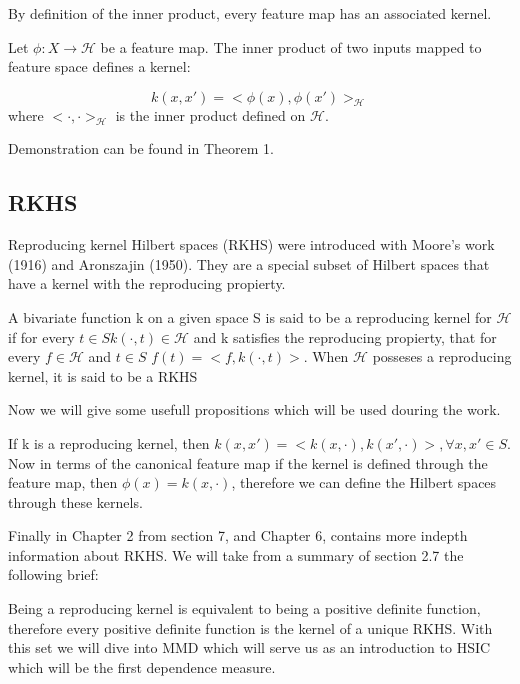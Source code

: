 By definition of the inner product, every feature map has an associated kernel.

\begin{defn}
Let $\phi:X\rightarrow\mathcal{H}$ be a feature map. The inner product of two inputs mapped to feature space defines a kernel:

$$
k(x,x') = <\phi(x),\phi(x')>_{\mathcal{H}}
$$
where $<\cdot,\cdot>_{\mathcal{H}}$ is the inner product defined on $\mathcal{H}$.
\end{defn}
Demonstration can be found in \cite{Feature_maps} Theorem 1.

\subsection{RKHS}
Reproducing kernel Hilbert spaces (RKHS) were introduced with Moore's work (1916) and Aronszajin (1950). They are a special subset of Hilbert spaces that have a kernel with the reproducing propierty.
\begin{defn}
A bivariate function k on a given space S is said to be a reproducing kernel for $\mathcal{H}$ if for every $t\in S k(\cdot,t)\in \mathcal{H}$ and k satisfies the reproducing propierty, that for every $f\in \mathcal{H}$ and $t \in S$ $f(t) = <f,k(\cdot,t)>$. When $\mathcal{H}$ posseses a reproducing kernel, it is said to be a RKHS
\end{defn}

Now we will give some usefull propositions which will be used douring the work. 
\begin{prop}
If k is a reproducing kernel, then $k(x,x') = <k(x,\cdot),k(x',\cdot)>, \forall x,x'\in S$.
Now in terms of the canonical feature map if the kernel is defined through the feature map, then $\phi(x) = k(x,\cdot)$, therefore we can define the Hilbert spaces through these kernels.
\end{prop}

Finally in \cite{RKHS_libro} Chapter 2 from section 7, and Chapter 6, contains more indepth information about RKHS.  We will take from a summary of section 2.7 the following brief:

Being a reproducing kernel is equivalent to being a positive definite function, therefore every positive definite function is the kernel of a unique RKHS.
With this set we will dive into MMD which will serve us as an introduction to HSIC which will be the first dependence measure.



